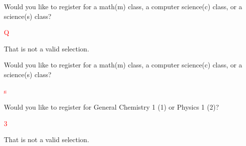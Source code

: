 \begin{sample}
    Would you like to register for a math(m) class, a computer science(c) class, or a science(s) class?

    \textcolor{red}{Q}

    That is not a valid selection.
\end{sample}

\begin{sample}
    Would you like to register for a math(m) class, a computer science(c) class, or a science(s) class?

    \textcolor{red}{s}

    Would you like to register for General Chemistry 1 (1) or Physics 1 (2)?

    \textcolor{red}{3}

    That is not a valid selection.
\end{sample}

